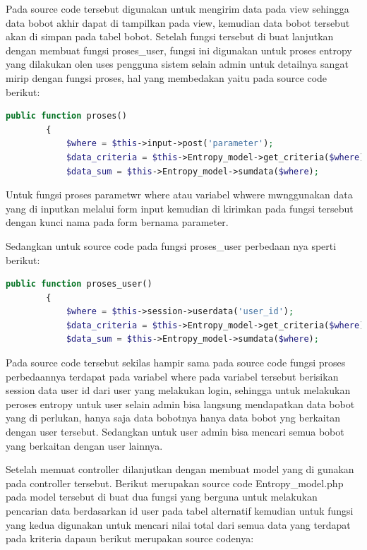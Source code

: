 Pada source code tersebut digunakan untuk mengirim data pada view sehingga data bobot akhir dapat di tampilkan pada view, kemudian data bobot tersebut akan di simpan pada tabel bobot. Setelah fungsi tersebut di buat lanjutkan dengan membuat fungsi proses\_user, fungsi ini digunakan untuk proses entropy yang dilakukan olen uses pengguna sistem selain admin untuk detailnya sangat mirip dengan fungsi proses, hal yang membedakan yaitu pada source code berikut:\par

\begin{lstlisting}[language=PHP]
	 public function proses()  
	    {  
	        $where = $this->input->post('parameter');  
	        $data_criteria = $this->Entropy_model->get_criteria($where);  
	        $data_sum = $this->Entropy_model->sumdata($where);  
\end{lstlisting}

Untuk fungsi proses parametwr where atau variabel whwere mwnggunakan data yang di inputkan melalui form input kemudian di kirimkan pada fungsi tersebut dengan kunci nama pada form bernama parameter.\par
Sedangkan untuk source code pada fungsi proses\_user perbedaan nya sperti berikut:

\begin{lstlisting}[language=PHP]
	public function proses_user()  
	    {  
	        $where = $this->session->userdata('user_id');  
	        $data_criteria = $this->Entropy_model->get_criteria($where);  
	        $data_sum = $this->Entropy_model->sumdata($where);  
\end{lstlisting}

Pada source code tersebut sekilas hampir sama pada source code fungsi proses perbedaannya terdapat pada variabel where pada variabel tersebut berisikan session data user id dari user yang melakukan login, sehingga untuk melakukan peroses entropy untuk user selain admin bisa langsung mendapatkan data bobot yang di perlukan, hanya saja data bobotnya hanya data bobot yng berkaitan dengan user tersebut. Sedangkan untuk user admin bisa mencari semua bobot yang berkaitan dengan user lainnya.\par
Setelah memuat controller dilanjutkan dengan membuat model yang di gunakan pada controller tersebut. Berikut merupakan source code Entropy\_model.php pada model tersebut di buat dua fungsi yang berguna untuk melakukan pencarian data berdasarkan id user pada tabel alternatif kemudian untuk fungsi yang kedua digunakan untuk mencari nilai total dari semua data yang terdapat pada kriteria dapaun berikut merupakan source codenya:\par

